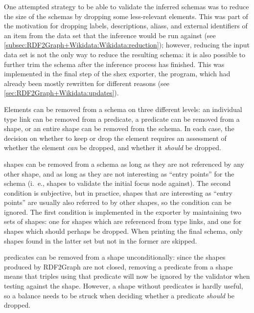 One attempted strategy to be able to validate the inferred \glspl{schema} %
was to reduce the size of the \glspl{schema} by dropping some less-relevant elements.
This was part of the motivation for dropping \glspl{label}, \glspl{description}, \glspl{alias}, and external identifiers of an \gls{item}
from the data set that the inference would be run against
(see \cref{subsec:RDF2Graph+Wikidata:Wikidata:reduction});
however, reducing the input data set is not the only way to reduce the resulting \gls{schema}:
it is also possible to further trim the \gls{schema} after the inference process has finished.
This was implemented in the final step of the \gls{shex} exporter,
the  program,
which had already been mostly rewritten for different reasons
(see \cref{sec:RDF2Graph+Wikidata:updates}).

Elements can be removed from a \gls{schema} on three different levels:
an individual \gls{type link} can be removed from a \gls{predicate},
a \gls{predicate} can be removed from a \gls{shape},
or an entire \gls{shape} can be removed from the \gls{schema}.
In each case, the decision on whether to keep or drop the element
requires an assessment of whether the element \emph{can} be dropped,
and whether it \emph{should} be dropped.

\Glspl{shape} can be removed from a \gls{schema} as long as they are not referenced by any other shape,
and as long as they are not interesting as “entry points” for the \gls{schema}
(i.~e., \glspl{shape} to validate the initial \gls{focus node} against).
The second condition is subjective,
but in practice, \glspl{shape} that are interesting as “entry points”
are usually also referred to by other \glspl{shape},
so the condition can be ignored.
The first condition is implemented in the exporter
by maintaining two sets of \glspl{shape}:
one for \glspl{shape} which are referenced from \glspl{type link},
and one for \glspl{shape} which should perhaps be dropped.
When printing the final \gls{schema},
only \glspl{shape} found in the latter set but not in the former are skipped.

\Glspl{predicate} can be removed from a \gls{shape} unconditionally:
since the \glspl{shape} produced by \gls{RDF2Graph} are not closed,
removing a \gls{predicate} from a \gls{shape} means that \glspl{triple} using that \gls{predicate}
will now be ignored by the validator when testing against the \gls{shape}.
However, a \gls{shape} without \glspl{predicate} is hardly useful,
so a balance needs to be struck when deciding whether a \gls{predicate} \emph{should} be dropped.


